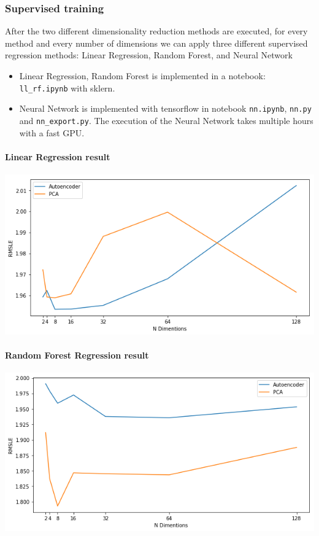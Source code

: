 \documentclass[11pt]{article}
\makeatletter
\def\maxwidth{\ifdim\Gin@nat@width>\linewidth\linewidth
    \else\Gin@nat@width\fi}
\let\Oldincludegraphics\includegraphics
\renewcommand{\includegraphics}[1]{\Oldincludegraphics[width=.8\maxwidth]{#1}}
\providecommand{\tightlist}{%
      \setlength{\itemsep}{0pt}\setlength{\parskip}{0pt}}
\makeatother
\begin{document}
    \hypertarget{supervised-training}{%
\subsubsection{Supervised training}\label{supervised-training}}

After the two different dimensionality reduction methods are executed,
for every method and every number of dimensions we can apply three
different supervised regression methods: Linear Regression, Random
Forest, and Neural Network

\begin{itemize}
\tightlist
\item
  Linear Regression, Random Forest is implemented in a notebook:
  \texttt{ll\_rf.ipynb} with sklern.
\item
  Neural Network is implemented with tensorflow in notebook
  \texttt{nn.ipynb}, \texttt{nn.py} and \texttt{nn\_export.py}. The
  execution of the Neural Network takes multiple hours with a fast GPU.
\end{itemize}

    \hypertarget{linear-regression-result}{%
\paragraph{Linear Regression result}\label{linear-regression-result}}

\includegraphics{images/lr.png}

    \hypertarget{random-forest-regression-result}{%
\paragraph{Random Forest Regression
result}\label{random-forest-regression-result}}

\includegraphics{images/rf.png}
\end{document}
